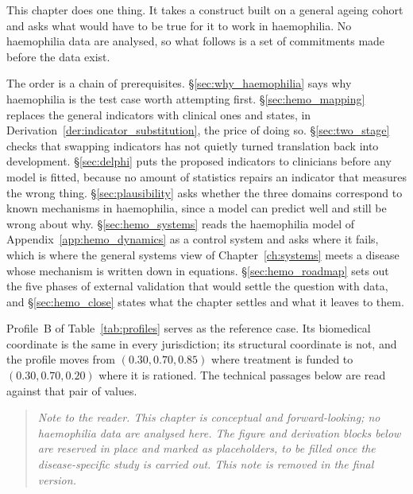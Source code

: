 
\label{ch:translational}


\begin{ataglance}
This chapter does one thing. It takes a construct built on a general ageing
cohort and asks what would have to be true for it to work in haemophilia. No
haemophilia data are analysed, so what follows is a set of commitments made
before the data exist.

The order is a chain of prerequisites. \S\ref{sec:why_haemophilia} says why
haemophilia is the test case worth attempting first. \S\ref{sec:hemo_mapping}
replaces the general indicators with clinical ones and states, in
Derivation~\ref{der:indicator_substitution}, the price of doing so.
\S\ref{sec:two_stage} checks that swapping indicators has not quietly turned
translation back into development. \S\ref{sec:delphi} puts the proposed
indicators to clinicians before any model is fitted, because no amount of
statistics repairs an indicator that measures the wrong thing.
\S\ref{sec:plausibility} asks whether the three domains correspond to known
mechanisms in haemophilia, since a model can predict well and still be wrong
about why. \S\ref{sec:hemo_systems} reads the haemophilia model of
Appendix~\ref{app:hemo_dynamics} as a control system and asks where it fails,
which is where the general systems view of Chapter~\ref{ch:systems} meets a
disease whose mechanism is written down in equations. \S\ref{sec:hemo_roadmap}
sets out the five phases of external validation that would settle the question
with data, and \S\ref{sec:hemo_close} states what the chapter settles and what
it leaves to them.

Profile~B of Table~\ref{tab:profiles} serves as the reference case. Its
biomedical coordinate is the same in every jurisdiction; its structural
coordinate is not, and the profile moves from $(0.30,0.70,0.85)$ where
treatment is funded to $(0.30,0.70,0.20)$ where it is rationed. The technical
passages below are read against that pair of values.
\end{ataglance}

\begin{quote}
\small\itshape
Note to the reader. This chapter is conceptual and forward-looking; no haemophilia data are analysed here. The figure and derivation blocks below are reserved in place and marked as placeholders, to be filled once the disease-specific study is carried out. This note is removed in the final version.
\end{quote}

